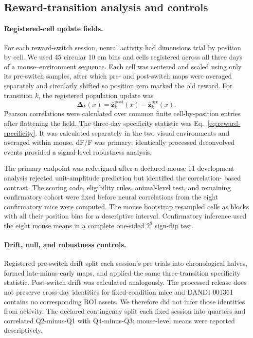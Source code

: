 \documentclass[10pt,twocolumn]{article}
\begin{document}
\subsection{Reward-transition analysis and controls}

\paragraph{Registered-cell update fields.}

For each reward-switch session, neural activity had dimensions trial by
position by cell. We used 45 circular 10 cm bins and cells registered across
all three days of a mouse--environment sequence. Each cell was centered and
scaled using only its pre-switch samples, after which pre- and post-switch maps
were averaged separately and circularly shifted so position zero marked the old
reward. For transition $k$, the registered population update was
\[
 \boldsymbol{\Delta}_{k}(x)
 =\bar{\mathbf z}^{\mathrm{post}}_{k}(x)
  -\bar{\mathbf z}^{\mathrm{pre}}_{k}(x).
\]
Pearson correlations were calculated over common finite cell-by-position
entries after flattening the field. The three-day specificity statistic was
Eq.~\ref{eq:reward-specificity}. It was calculated separately in the two
visual environments and averaged within mouse. dF/F was primary; identically
processed deconvolved events provided a signal-level robustness analysis.

The primary endpoint was redesigned after a declared mouse-11 development
analysis rejected unit-amplitude prediction but identified the correlation-
based contrast. The scoring code, eligibility rules, animal-level test, and
remaining confirmatory cohort were fixed before neural correlations from the
eight confirmatory mice were computed. The mouse bootstrap resampled cells as
blocks with all their position bins for a descriptive interval. Confirmatory
inference used the eight mouse means in a complete one-sided $2^8$ sign-flip
test.

\paragraph{Drift, null, and robustness controls.}

Registered pre-switch drift split each session's pre trials into chronological
halves, formed late-minus-early maps, and applied the same three-transition
specificity statistic. Post-switch drift was calculated analogously. The
processed release does not preserve cross-day identities for fixed-condition
mice and DANDI 001361 contains no corresponding ROI assets. We therefore did
not infer those identities from activity. The declared contingency split each
fixed session into quarters and correlated Q2-minus-Q1 with Q4-minus-Q3;
mouse-level means were reported descriptively.
\end{document}
